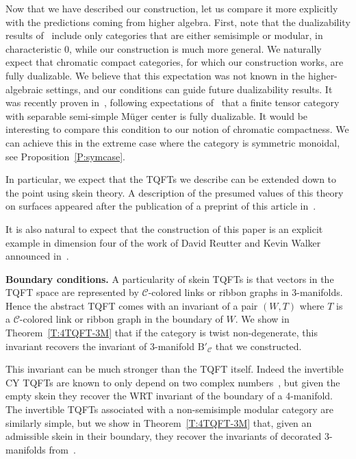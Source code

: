 \documentclass[10pt,a4paper]{amsart}
\numberwithin{equation}{section}
\numberwithin{theorem}{section}
\numberwithin{proposition}{section}
\numberwithin{definition}{section}
\numberwithin{lemma}{section}
\numberwithin{corollary}{section}
\numberwithin{remark}{section}
\numberwithin{example}{section}
\newcommand{\cat}{\mathcal{C}}
\newcommand{\ThreeManInv}{\mathrm{B}}
\newcommand{\BB}{\ThreeManInv}
\begin{document}
Now that we have described our construction, let us compare it more explicitly with the predictions coming from higher algebra. First, note that the dualizability results of~\cite{BJSS, BJS} include only categories that are either semisimple or modular, in characteristic 0,
while
our construction is much more general. We naturally expect that chromatic compact categories, for which our construction works, are fully dualizable. We believe that this expectation was not known in the higher-algebraic
settings,
 and our conditions can guide future dualizability results.
It was recently proven in~\cite{DecoppetRelativeInvert}, following expectations of~\cite{BJSS} that a finite tensor category with separable semi-simple M\"uger center is fully dualizable. It would be interesting to compare this condition to our notion of chromatic compactness. We can achieve this in the extreme case where the category is symmetric monoidal, see Proposition~\ref{P:symcase}.

In particular, we expect that the TQFTs we describe can be extended down to the point using skein theory. A description of the presumed values of this theory on surfaces appeared after the publication of a preprint of this article in~\cite{BH}.

It is also natural to expect that the construction of this paper is an explicit
example
 in dimension four of the work of David Reutter and Kevin Walker announced in~\cite{ReutterWalker1,Walker2021,ReutterWalker2}.

\textbf{Boundary conditions.}
A particularity of skein TQFTs is that vectors in the TQFT space are
represented by $\cat$-colored links or ribbon graphs in 3-manifolds.
Hence the abstract TQFT comes with an invariant of
a pair $(W,T)$ where $T$ is a $\cat$-colored link
or ribbon graph in the boundary of $W$. We show in Theorem~\ref{T:4TQFT-3M} that if the category is twist
non-degenerate, this invariant recovers the invariant of 3-manifold $\BB'_\cat$ that we constructed.

This invariant can be much stronger than the TQFT itself. Indeed the invertible CY TQFTs are known to only depend on two complex numbers~\cite[Theorem~7.6]{SP}, but given the empty skein they recover the WRT invariant of the boundary of a 4-manifold. The invertible TQFTs associated with a non-semisimple modular category are similarly simple, but we show in Theorem~\ref{T:4TQFT-3M} that, given an admissible skein in their boundary, they recover the invariants of decorated 3-manifolds from~\cite{DRGGPMR2022}.
\end{document}
